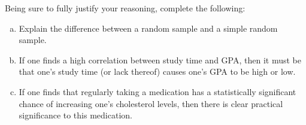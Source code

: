 \documentclass[11pt,letterpaper]{article}
\begin{document}
\newpage



 Being sure to fully justify your reasoning, complete the following:
	\begin{enumerate}[(a)]
	\item Explain the difference between a random sample and a simple random sample. 
	\item If one finds a high correlation between study time and GPA, then it must be that one's study time (or lack thereof) causes one's GPA to be high or low. 
	\item If one finds that regularly taking a medication has a statistically significant chance of increasing one's cholesterol levels, then there is clear practical significance to this medication. 
	\end{enumerate}
\end{document}
